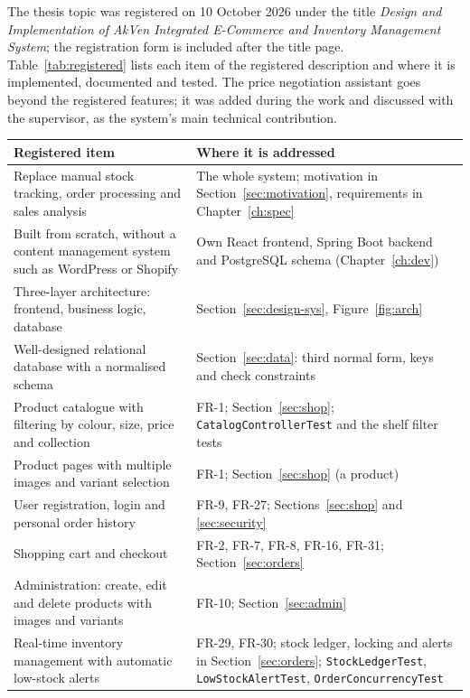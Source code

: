 The thesis topic was registered on 10 October 2026 under the title \emph{Design and Implementation of AkVen Integrated
E-Commerce and Inventory Management System}; the registration form is included after the title page.
Table~\ref{tab:registered} lists each item of the registered description and where it is implemented, documented and
tested. The price negotiation assistant goes beyond the registered features; it was added during the work and discussed
with the supervisor, as the system's main technical contribution.

{\small
\begin{longtable}{>{\raggedright\arraybackslash}p{5.2cm} >{\raggedright\arraybackslash}p{8.3cm}}
	\toprule
	\textbf{Registered item} & \textbf{Where it is addressed} \\
	\midrule
	\endhead
	Replace manual stock tracking, order processing and sales analysis &
	The whole system; motivation in Section~\ref{sec:motivation}, requirements in Chapter~\ref{ch:spec} \\
	Built from scratch, without a content management system such as WordPress or Shopify &
	Own React frontend, Spring Boot backend and PostgreSQL schema (Chapter~\ref{ch:dev}) \\
	Three-layer architecture: frontend, business logic, database &
	Section~\ref{sec:design-sys}, Figure~\ref{fig:arch} \\
	Well-designed relational database with a normalised schema &
	Section~\ref{sec:data}: third normal form, keys and check constraints \\
	Product catalogue with filtering by colour, size, price and collection &
	FR-1; Section~\ref{sec:shop}; \texttt{CatalogControllerTest} and the shelf filter tests \\
	Product pages with multiple images and variant selection &
	FR-1; Section~\ref{sec:shop} (a product) \\
	User registration, login and personal order history &
	FR-9, FR-27; Sections~\ref{sec:shop} and \ref{sec:security} \\
	Shopping cart and checkout &
	FR-2, FR-7, FR-8, FR-16, FR-31; Section~\ref{sec:orders} \\
	Administration: create, edit and delete products with images and variants &
	FR-10; Section~\ref{sec:admin} \\
	Real-time inventory management with automatic low-stock alerts &
	FR-29, FR-30; stock ledger, locking and alerts in Section~\ref{sec:orders}; \texttt{StockLedgerTest},
	\texttt{LowStockAlertTest}, \texttt{OrderConcurrencyTest} \\

\end{longtable}}
